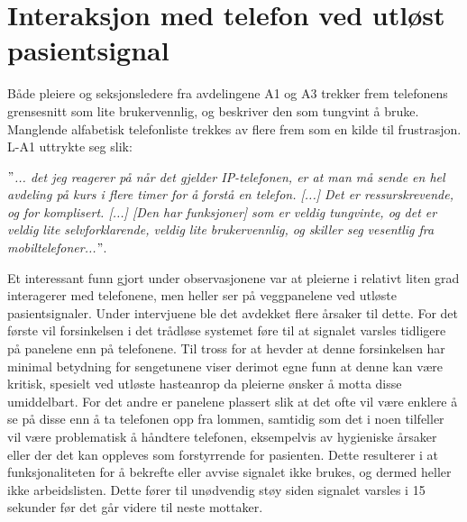 \section{Interaksjon med telefon ved utløst pasientsignal}
Både pleiere og seksjonsledere fra avdelingene A1 og A3 trekker frem telefonens grensesnitt som lite brukervennlig, og beskriver den som tungvint å bruke. Manglende alfabetisk telefonliste trekkes av flere frem som en kilde til frustrasjon. L-A1 uttrykte seg slik:

\noindent
\textit{ $"$... det jeg reagerer på når det gjelder IP-telefonen, er at man må sende en hel avdeling på kurs i flere timer for å forstå en telefon. [...] Det er ressurskrevende, og for komplisert. [...] [Den har funksjoner] som er veldig tungvinte, og det er veldig lite selvforklarende, veldig lite brukervennlig, og skiller seg vesentlig fra mobiltelefoner...$"$}.

\noindent
Et interessant funn gjort under observasjonene var at pleierne i relativt liten grad interagerer med telefonene, men heller ser på veggpanelene ved utløste pasientsignaler. Under intervjuene ble det avdekket flere årsaker til dette. For det første vil forsinkelsen i det trådløse systemet føre til at signalet varsles tidligere på panelene enn på telefonene. Til tross for at \citet{Sletten09} hevder at denne forsinkelsen har minimal betydning for sengetunene viser derimot egne funn at denne kan være kritisk, spesielt ved utløste hasteanrop da pleierne ønsker å motta disse umiddelbart. For det andre er panelene plassert slik at det ofte vil være enklere å se på disse enn å ta telefonen opp fra lommen, samtidig som det i noen tilfeller vil være problematisk å håndtere telefonen, eksempelvis av hygieniske årsaker eller der det kan oppleves som forstyrrende for pasienten. Dette resulterer i at funksjonaliteten for å bekrefte eller avvise signalet ikke brukes, og dermed heller ikke arbeidslisten. Dette fører til unødvendig støy siden signalet varsles i 15 sekunder før det går videre til neste mottaker. 

